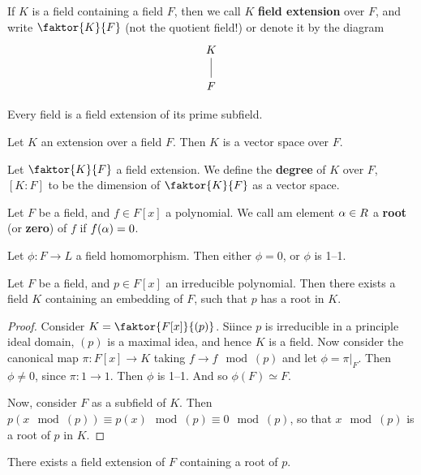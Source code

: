 \begin{definition}
    If $K$ is a field containing a field $F$, then we call  $K$  \textbf{field
    extension} over $F$, and write  $\faktor{K}{F}$ (not the quotient field!) or
    denote it by the diagram
    \[\begin{tikzcd}
        K \\
        F
        \arrow[no head, from=1-1, to=2-1]
    \end{tikzcd}\]
\end{definition}

\begin{lemma}\label{1.1.2}
    Every field is a field extension of its prime subfield.
\end{lemma}

\begin{lemma}\label{1.1.3}
    Let $K$ an extension over a field  $F$. Then  $K$ is a vector space over
    $F$.
\end{lemma}

\begin{definition}
    Let $\faktor{K}{F}$ a field extension. We define the \textbf{degree} of $K$
    over $F$, $[K:F]$ to be the dimension of  $\faktor{K}{F}$ as a vector space.
\end{definition}

\begin{definition}
    Let $F$ be a field, and  $f \in F[x]$ a polynomial. We call am element $\alpha
    \in R$ a  \textbf{root} (or \textbf{zero}) of $f$ if  $f(\alpha)=0$.
\end{definition}

\begin{lemma}\label{1.1.4}
    Let $\phi:F \xrightarrow{} L$ a field homomorphism. Then either $\phi=0$, or
     $\phi$ is 1--1.
\end{lemma}

\begin{lemma}\label{1.1.5}
    Let $F$ be a field, and  $p \in F[x]$ an irreducible polynomial. Then there
    exists a field $K$ containing an embedding of  $F$, such that  $p$ has a
    root in  $K$.
\end{lemma}
\begin{proof}
    Consider $K=\faktor{F[x]}{(p)}$. Siince $p$ is irreducible in a principle
    ideal domain, $(p)$ is a maximal idea, and hence $K$ is a field. Now
    consider the canonical map  $\pi:F[x] \xrightarrow{} K$ taking $f
    \xrightarrow{} f \mod{(p)}$ and let $\phi=\pi|_{F}$. Then $\phi \neq 0$,
    since  $\pi:1 \xrightarrow{} 1$. Then $\phi$ is 1--1. And so  $\phi(F)
    \simeq F$.

    Now, consider $F$ as a subfield of  $K$. Then $p(x \mod{(p)}) \equiv
    p(x) \mod{(p)} \equiv 0 \mod{(p)}$, so that $x \mod{(p)}$ is a root of
    $p$ in  $K$.
\end{proof}
\begin{corollary}
    There exists a field extension of $F$ containing a root of  $p$.
\end{corollary}


